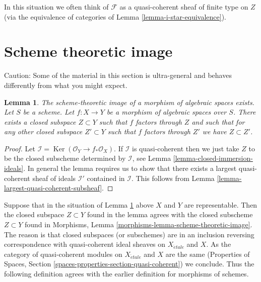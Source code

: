 \documentclass{stacks-project}
\newenvironment{slogan}{\comment}{\endcomment}
\theoremstyle{plain}
\newtheorem{lemma}[subsection]{Lemma}
\theoremstyle{definition}
\theoremstyle{remark}
\numberwithin{equation}{subsection}
\def\etale{{\acute{e}tale}}
\def\Ker{\mathop{\mathrm{Ker}}}
\begin{document}
\noindent
In this situation we often think of $\mathcal{F}$ as a quasi-coherent
sheaf of finite type on $Z$ (via the equivalence of categories of
Lemma \ref{lemma-i-star-equivalence}).






\section{Scheme theoretic image}
\label{section-scheme-theoretic-image}

\noindent
Caution: Some of the material in this section is ultra-general and
behaves differently from what you might expect.

\begin{lemma}
\label{lemma-scheme-theoretic-image}
\begin{slogan}
The scheme-theoretic image of a morphism of algebraic spaces exists.
\end{slogan}
Let $S$ be a scheme. Let $f : X \to Y$ be a morphism of algebraic spaces
over $S$. There exists a closed subspace $Z \subset Y$ such that $f$ factors
through $Z$ and such that for any other closed subspace $Z' \subset Y$
such that $f$ factors through $Z'$ we have $Z \subset Z'$.
\end{lemma}

\begin{proof}
Let $\mathcal{I} = \Ker(\mathcal{O}_Y \to f_*\mathcal{O}_X)$.
If $\mathcal{I}$ is quasi-coherent then we just take $Z$ to be the
closed subscheme determined by $\mathcal{I}$, see
Lemma \ref{lemma-closed-immersion-ideals}.
In general the lemma requires us to show that there exists
a largest quasi-coherent sheaf of ideals $\mathcal{I}'$ contained in
$\mathcal{I}$.
This follows from Lemma \ref{lemma-largest-quasi-coherent-subsheaf}.
\end{proof}

\noindent
Suppose that in the situation of Lemma \ref{lemma-scheme-theoretic-image}
above $X$ and $Y$ are representable. Then the closed subspace $Z \subset Y$
found in the lemma agrees with the closed subscheme $Z \subset Y$ found in
Morphisms, Lemma \ref{morphisms-lemma-scheme-theoretic-image}.
The reason is that closed subspaces (or subschemes) are in an inclusion
reversing correspondence with quasi-coherent ideal sheaves on
$X_\etale$ and $X$. As the category of quasi-coherent modules
on $X_\etale$ and $X$ are the same
(Properties of Spaces, Section \ref{spaces-properties-section-quasi-coherent})
we conclude. Thus the following definition agrees with the earlier
definition for morphisms of schemes.
\end{document}
